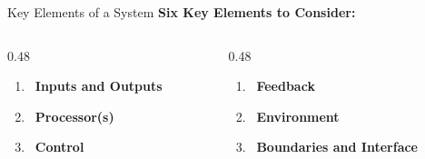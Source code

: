 \documentclass[aspectratio=169]{beamer}
\begin{document}
\begin{frame}{Key Elements of a System}
    \textbf{Six Key Elements to Consider:}


     \begin{columns}
        \begin{column}{0.48\textwidth}
          \begin{enumerate}
        \item[1.] \faArrowRight\, \textbf{Inputs and Outputs } 
   
        \item[2.] \faCog\, \textbf{Processor(s)}
      
        
        \item[3.] \faGamepad\, \textbf{Control}

 

         
    \end{enumerate}
    
        \end{column}
            \begin{column}{0.48\textwidth}
              \begin{enumerate} 

          \item[4.] \faRetweet\, \textbf{Feedback}
    
        \item[5.] \faGlobe\, \textbf{Environment} 
        \item[6.] \faDrawPolygon\, \textbf{Boundaries and Interface}

         
    \end{enumerate}
        \end{column}

        \end{columns}
    
\end{frame}

 
\end{document}
